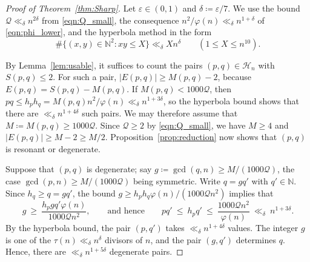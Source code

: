 \documentclass[12pt]{amsart}
\theoremstyle{definition}
\newcommand{\N}{\mathbb{N}}
\begin{document}
\begin{proof}[Proof of Theorem~\ref{thm:Sharp}]
Let $\varepsilon\in(0,1)$ and $\delta\coloneq \varepsilon/7$.  We use the bound $\mathcal{Q}\ll_{\delta}n^{2\delta}$ from \eqref{eqn:Q_small}, the consequence $n^2/\varphi(n)\ll_{\delta}n^{1+\delta}$ of \eqref{eqn:phi_lower}, and the hyperbola method in the form
\[
\#\{(x,y)\in\N^2\colon xy\le X\}\ll_{\delta}Xn^{\delta}\qquad(1\le X\le n^{10}).
\]

By Lemma~\ref{lem:usable}, it suffices to count the pairs $(p,q)\in\mathcal{H}_n$ with $S(p,q)\le2$.  For such a pair, $|E(p,q)|\ge M(p,q)-2$, because $E(p,q)=S(p,q)-M(p,q)$.  If $M(p,q)<1000 \mathcal{Q}$, then $pq\le h_ph_q=M(p,q)n^2/\varphi(n)\ll_{\delta}n^{1+3\delta}$, so the hyperbola bound shows that there are $\ll_{\delta}n^{1+4\delta}$ such pairs.  We may therefore assume that $M\coloneq M(p,q)\ge1000 \mathcal{Q}$.  Since $\mathcal{Q}\ge2$ by \eqref{eqn:Q_small}, we have $M\ge4$ and $|E(p,q)|\ge M-2\ge M/2$. Proposition~\ref{prop:reduction} now shows that $(p,q)$ is resonant or degenerate.

Suppose that $(p,q)$ is degenerate; say $g\coloneq \gcd(q,n)\ge M/(1000 \mathcal{Q})$, the case $\gcd(p,n)\ge M/(1000 \mathcal{Q})$ being symmetric.  Write $q=gq'$ with $q'\in\N$.  Since $h_q\ge q=gq'$, the bound $g\ge h_ph_q\varphi(n)/(1000 \mathcal{Q}n^2)$ implies that
\[
g\ \ge\ \frac{h_p g q' \varphi(n)}{1000 \mathcal{Q} n^2}, \qquad\text{and hence}\qquad pq'\ \le\ h_pq'\ \le\ \frac{1000 \mathcal{Q} n^2}{\varphi(n)}\ \ll_{\delta}\ n^{1+3\delta}.
\]
By the hyperbola bound, the pair $(p,q')$ takes $\ll_{\delta}n^{1+4\delta}$ values.  The integer $g$ is one of the $\tau(n)\ll_{\delta}n^{\delta}$ divisors of $n$, and the pair $(g,q')$ determines $q$.  Hence, there are $\ll_{\delta}n^{1+5\delta}$ degenerate pairs.


\end{proof}
\end{document}
